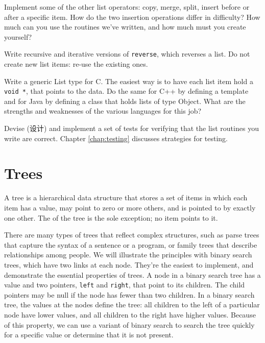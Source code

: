 \begin{exercise}
Implement some of the other list operators: copy, merge, split, insert
before or after a specific item. How do the two insertion operations differ
in difficulty? How much can you use the routines we've written, and how
much must you create yourself?
\end{exercise}

\begin{exercise}
Write recursive and iterative versions of \verb'reverse', which reverses a
list.  Do not create new list items: re-use the existing ones.
\end{exercise}

\begin{exercise}
Write a generic List type for C. The easiest way is to have each list item
hold a \verb'void *', that points to the data. Do the same for C++ by
defining a template and for Java by defining a class that holds lists of
type Object. What are the strengths and weaknesses of the various languages
for this job?
\end{exercise}

\begin{exercise}
    Devise (设计) and implement a set of tests for verifying that the list
    routines you write are correct. Chapter \ref{chap:testing} discusses
    strategies for testing.
\end{exercise}

\section{Trees}
\label{sec:trees}

A tree is a hierarchical data structure that stores a set of items in which
each item has a value, may point to zero or more others, and is pointed to
by exactly one other. The  of the tree is the sole
exception; no item points to it.

There are many types of trees that reflect complex structures, such as
parse trees that capture the syntax of a sentence or a program, or family
trees that describe relationships among people. We will illustrate the
principles with binary search trees, which have two links at each node.
They're the easiest to implement, and demonstrate the essential properties
of trees. A node in a binary search tree has a value and two pointers,
\verb'left' and \verb'right', that point to its children. The child
pointers may be null if the node has fewer than two children. In a binary
search tree, the values at the nodes define the tree: all children to the
left of a particular node have lower values, and all children to the right
have higher values. Because of this property, we can use a variant of
binary search to search the tree quickly for a specific value or determine
that it is not present.

